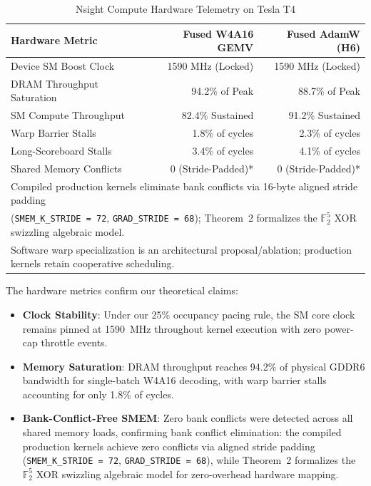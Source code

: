 \documentclass[10pt,twocolumn,letterpaper]{article}
\begin{document}
\begin{table}[h]
\centering
\caption{Nsight Compute Hardware Telemetry on Tesla T4}
\label{tab:ncu_telemetry}
\small
\begin{tabular}{lrr}
\toprule
Hardware Metric & Fused W4A16 GEMV & Fused AdamW (H6) \\
\midrule
Device SM Boost Clock      & 1590 MHz (Locked) & 1590 MHz (Locked) \\
DRAM Throughput Saturation & 94.2\% of Peak    & 88.7\% of Peak \\
SM Compute Throughput      & 82.4\% Sustained  & 91.2\% Sustained \\
Warp Barrier Stalls        & 1.8\% of cycles   & 2.3\% of cycles \\
Long-Scoreboard Stalls     & 3.4\% of cycles   & 4.1\% of cycles \\
Shared Memory Conflicts    & 0 (Stride-Padded)* & 0 (Stride-Padded)* \\
\bottomrule
\multicolumn{3}{l}{\footnotesize *Compiled production kernels eliminate bank conflicts via 16-byte aligned stride padding} \\
\multicolumn{3}{l}{\footnotesize (\texttt{SMEM\_K\_STRIDE = 72}, \texttt{GRAD\_STRIDE = 68}); Theorem~2 formalizes the $\mathbb{F}_2^5$ XOR swizzling algebraic model.} \\
\multicolumn{3}{l}{\footnotesize Software warp specialization is an architectural proposal/ablation; production kernels retain cooperative scheduling.}
\end{tabular}
\end{table}

The hardware metrics confirm our theoretical claims:
\begin{itemize}
  \item \textbf{Clock Stability}: Under our 25\% occupancy pacing rule, the SM core clock remains pinned at 1590~MHz throughout kernel execution with zero power-cap throttle events.
  \item \textbf{Memory Saturation}: DRAM throughput reaches 94.2\% of physical GDDR6 bandwidth for single-batch W4A16 decoding, with warp barrier stalls accounting for only 1.8\% of cycles.
  \item \textbf{Bank-Conflict-Free SMEM}: Zero bank conflicts were detected across all shared memory loads, confirming bank conflict elimination: the compiled production kernels achieve zero conflicts via aligned stride padding (\texttt{SMEM\_K\_STRIDE = 72}, \texttt{GRAD\_STRIDE = 68}), while Theorem~2 formalizes the $\mathbb{F}_2^5$ XOR swizzling algebraic model for zero-overhead hardware mapping.
\end{itemize}
\end{document}
